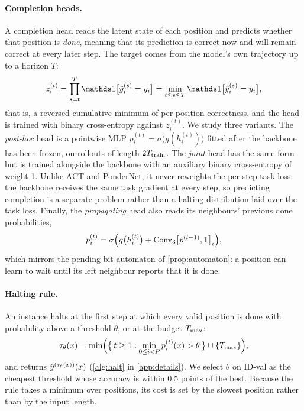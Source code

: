 \paragraph{Completion heads.} A completion head reads the latent state of each position and predicts
whether that position is \emph{done}, meaning that its prediction is correct now and will remain correct
at every later step. The target comes from the model's own trajectory up to a horizon $T$:
\begin{equation}
  z_i^{(t)} = \prod_{s=t}^{T}\ind\bigl[\yhat_i^{(s)} = y_i\bigr]
  = \min_{t\le s\le T}\ind\bigl[\yhat_i^{(s)} = y_i\bigr],
  \label{eq:done}
\end{equation}
that is, a reversed cumulative minimum of per-position correctness, and the head is trained with binary
cross-entropy against $z_i^{(t)}$. We study three variants. The \emph{post-hoc} head is a pointwise MLP
$p_i^{(t)} = \sigma\bigl(g(h_i^{(t)})\bigr)$ fitted after the backbone has been frozen, on rollouts of
length $2T_{\mathrm{train}}$. The \emph{joint} head has the same form but is trained alongside the backbone with an
auxiliary binary cross-entropy of weight 1. Unlike ACT and PonderNet, it never reweights the per-step
task loss: the backbone receives the same task gradient at every step, so predicting completion is a
separate problem rather than a halting distribution laid over the task loss. Finally, the
\emph{propagating} head also reads its neighbours' previous done probabilities,
\begin{equation}
  p_i^{(t)} = \sigma\Bigl(g\bigl(h_i^{(t)}\bigr) + \mathrm{Conv}_3\bigl[p^{(t-1)}, \mathbf 1\bigr]_i\Bigr),
  \label{eq:prop}
\end{equation}
which mirrors the pending-bit automaton of \cref{prop:automaton}: a position can learn to wait until
its left neighbour reports that it is done.

\paragraph{Halting rule.} An instance halts at the first step at which every valid position is done with
probability above a threshold $\theta$, or at the budget $T_{\max}$:
\begin{equation}
  \tau_\theta(x) = \min\Bigl(\bigl\{\,t\ge 1 : \min_{0\le i<P} p_i^{(t)}(x) > \theta\,\bigr\}\cup\{T_{\max}\}\Bigr),
  \label{eq:halt}
\end{equation}
and returns $\hat{y}^{(\tau_\theta(x))}(x)$ (\cref{alg:halt} in \cref{app:details}). We select $\theta$ on
ID-val as the cheapest threshold whose accuracy is within 0.5 points of the best. Because the rule takes a
minimum over positions, its cost is set by the slowest position rather than by the input length.

